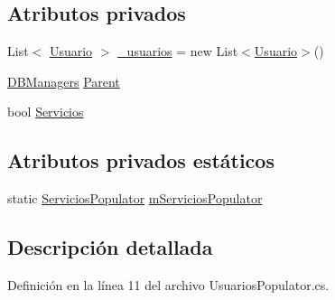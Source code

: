 \subsection*{Atributos privados}
\begin{DoxyCompactItemize}
\item 
List$<$ \hyperlink{class_proyecto___integrador__3_1_1_tipos_dato_1_1_usuario}{Usuario} $>$ \hyperlink{class_proyecto___integrador__3_1_1_d_b_managers_1_1_usuarios_populator_a4e30b143aa6f019cf45324d6192ea802}{\-\_\-usuarios} = new List$<$\hyperlink{class_proyecto___integrador__3_1_1_tipos_dato_1_1_usuario}{Usuario}$>$()
\item 
\hyperlink{class_proyecto___integrador__3_1_1_d_b_managers}{D\-B\-Managers} \hyperlink{class_proyecto___integrador__3_1_1_d_b_managers_1_1_usuarios_populator_a262c4a0f4d44e86a9030208d6cb6d26a}{Parent}
\item 
bool \hyperlink{class_proyecto___integrador__3_1_1_d_b_managers_1_1_usuarios_populator_a6986794b35361485b9507cdccf8e8abe}{Servicios}
\end{DoxyCompactItemize}
\subsection*{Atributos privados estáticos}
\begin{DoxyCompactItemize}
\item 
static \hyperlink{class_proyecto___integrador__3_1_1_d_b_managers_1_1_servicios_populator}{Servicios\-Populator} \hyperlink{class_proyecto___integrador__3_1_1_d_b_managers_1_1_usuarios_populator_a38322db59dd24df528d67958f931921e}{m\-Servicios\-Populator}
\end{DoxyCompactItemize}


\subsection{Descripción detallada}


Definición en la línea 11 del archivo Usuarios\-Populator.\-cs.



